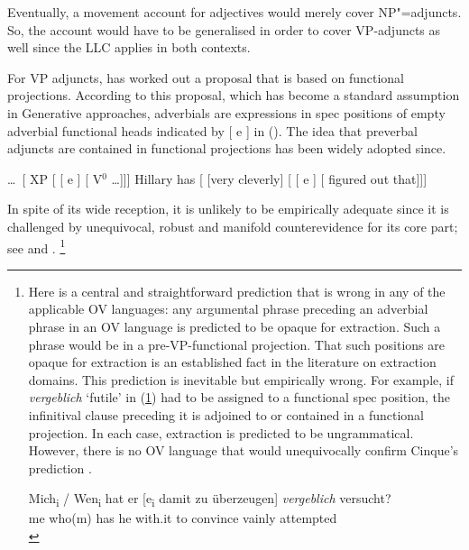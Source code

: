 \documentclass[output=paper
  ,nobabel
  ,uniformtopskip %
]{langscibook}
\begin{document}
\label{ex-preis}

\label{ex-wert}
\zl

\noindent
Eventually, a movement account for adjectives would merely cover NP"=adjuncts. So, the account would have to be generalised in order to cover VP-adjuncts as well since the LLC applies in both contexts. 

For VP adjuncts, \citet{Cinque99a-u} has worked out a proposal that is based on functional
projections. According to this proposal, which has become a standard assumption in Generative
approaches, adverbials are expressions in spec positions of empty adverbial functional heads
indicated by [ e ] in (). The idea that preverbal adjuncts are contained in functional projections has been widely adopted since.

\eal
\ex \ldots\ [ XP [ [ e ] [ V$^0$ \ldots]]]
\ex Hillary has [ [very cleverly] [ [ e ] [ figured out that]]]
\zl

\noindent
In spite of its wide reception, it is unlikely to be empirically adequate since it is challenged by unequivocal, robust and manifold counterevidence for its core part; see \citet[Section~6.4, 6.5]{Haider2013} and \citet{Haider2004}.%
%
\footnote{Here is a central and straightforward prediction that is wrong in any of the applicable OV languages: any argumental phrase preceding an adverbial phrase in an OV language is predicted to be opaque for extraction. Such a phrase would be in a pre-VP-functional projection. That such positions are opaque for extraction is an established fact in the literature on extraction domains. This prediction is inevitable but empirically wrong. For example, if \emph{vergeblich} `futile' in (\ref{ex-überzeugen}) had to be assigned to a functional spec position, the infinitival clause preceding it is adjoined to or contained in a functional projection. In each case, extraction is predicted to be ungrammatical. However, there is no OV language that would unequivocally confirm Cinque's prediction \citep[see][]{Haider2004}.

\ea\label{ex-überzeugen}
\gll Mich\textsubscript{i} / Wen\textsubscript{i} hat er [e\textsubscript{i} damit zu überzeugen] \emph{vergeblich} versucht? \\
     me                   {} who(m) has he {} with.it to convince vainly attempted \\
\zlast
}
\end{document}
